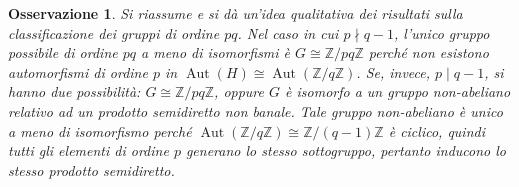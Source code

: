 \documentclass[11pt]{scrartcl}
\theoremstyle{style1}
\newtheorem{osservazione}{Osservazione}[section]
\numberwithin{equation}{subsection}
\begin{document}
\begin{osservazione}
Si riassume e si d\`a un'idea qualitativa dei risultati sulla classificazione dei gruppi di ordine $pq$. 
Nel caso in cui $p  \nmid q-1$, l'unico gruppo possibile di ordine $pq$ a meno di isomorfismi \`e $G \cong \mathbb{Z} / pq\mathbb{Z}$ perch\'e non esistono automorfismi di ordine $p$ in $\operatorname{Aut} (H)\cong \operatorname{Aut} (\mathbb{Z}/q\mathbb{Z})$.
Se, invece, $p  \mid q-1$, si hanno due possibilit\`a: $G \cong \mathbb{Z}/ pq\mathbb{Z}$, oppure $G$ \`e isomorfo a un gruppo non-abeliano relativo ad un prodotto semidiretto non banale. 
Tale gruppo non-abeliano \`e unico a meno di isomorfismo perch\'e $\operatorname{Aut} (\mathbb{Z}/q\mathbb{Z}) \cong \mathbb{Z}/(q-1)\mathbb{Z}$ \`e ciclico, quindi tutti gli elementi di ordine $p$ generano lo stesso sottogruppo, pertanto inducono lo stesso prodotto semidiretto.
\end{osservazione}
\end{document}

